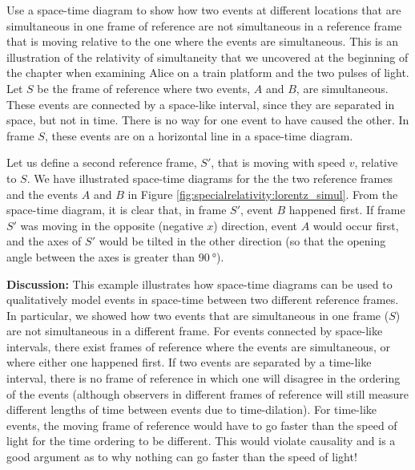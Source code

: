 \begin{example}{Use a space-time diagram to show how two events at different locations that are simultaneous in one frame of reference are not simultaneous in a reference frame that is moving relative to the one where the events are simultaneous. This is an illustration of the relativity of simultaneity that we uncovered at the beginning of the chapter when examining Alice on a train platform and the two pulses of light.}
Let $S$ be the frame of reference where two events, $A$ and $B$, are simultaneous. These events are connected by a space-like interval, since they are separated in space, but not in time. There is no way for one event to have caused the other. In frame $S$, these events are on a horizontal line in a space-time diagram.

Let us define a second reference frame, $S'$, that is moving with speed $v$, relative to $S$. We have illustrated space-time diagrams for the the two reference frames and the events $A$ and $B$ in Figure \ref{fig:specialrelativity:lorentz_simul}.
From the space-time diagram, it is clear that, in frame $S'$, event $B$ happened first. If frame $S'$ was moving in the opposite (negative $x$) direction, event $A$ would occur first, and the axes of $S'$ would be tilted in the other direction (so that the opening angle between the axes is greater than $\SI{90}{\degree}$).

\textbf{Discussion: }This example illustrates how space-time diagrams can be used to qualitatively model events in space-time between two different reference frames. In particular, we showed how two events that are simultaneous in one frame ($S$) are not simultaneous in a different frame. For events connected by space-like intervals, there exist frames of reference where the events are simultaneous, or where either one happened first. If two events are separated by a time-like interval, there is no frame of reference in which one will disagree in the ordering of the events (although observers in different frames of reference will still measure different lengths of time between events due to time-dilation). For time-like events, the moving frame of reference would have to go faster than the speed of light for the time ordering to be different. This would violate causality and is a good argument as to why nothing can go faster than the speed of light!
\end{example}

